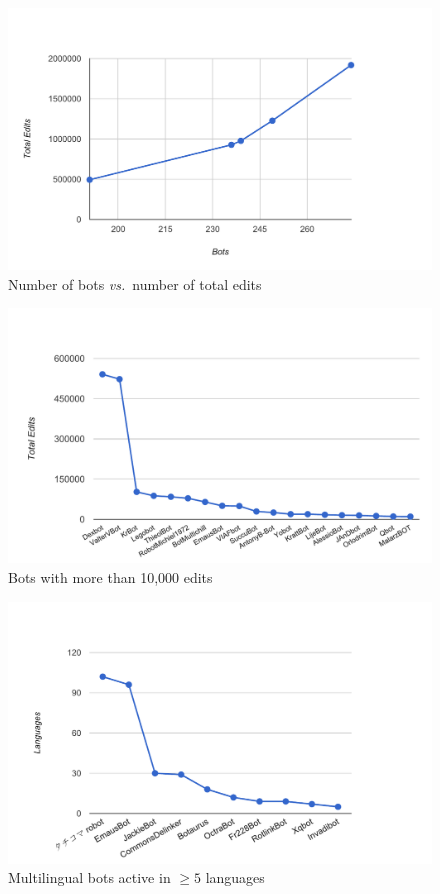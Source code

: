 \documentclass{sig-alternate}
\begin{document}
\begin{figure}[p]
  \center
  \includegraphics[width=0.84\linewidth]{bots-total-edits.pdf}
  \caption{Number of bots \emph{vs.}\ number of total edits}
  \label{fig:bots-total-edits}
\end{figure}

\begin{figure}[p]
  \center
  \includegraphics[width=\linewidth]{most-active-bots.pdf}
  \caption{Bots with more than 10,000 edits}
  \label{fig:most-active-bots}
\end{figure}

\begin{figure}[p]
  \center
  \includegraphics[width=\linewidth]{multilingual-bots.pdf}
  \caption{Multilingual bots active in $\geq5$ languages}
  \label{fig:multilingual-bots}
\end{figure}
\end{document}
